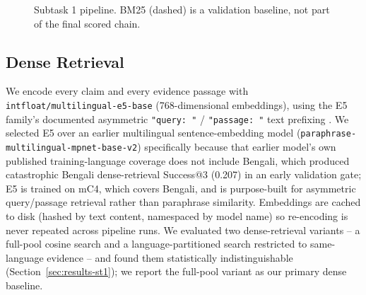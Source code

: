 \documentclass[
]{ceurart}
\begin{document}
\begin{figure}[h]
  \centering
  \caption{Subtask 1 pipeline. BM25 (dashed) is a validation baseline,
    not part of the final scored chain.}
  \label{fig:st1-pipeline}
\end{figure}

\subsection{Dense Retrieval}

We encode every claim and every evidence passage with
\texttt{intfloat/multilingual-e5-base} (768-dimensional embeddings),
using the E5 family's documented asymmetric \texttt{"query: "} /
\texttt{"passage: "} text prefixing \cite{wang2024multilingual}. We
selected E5 over an earlier multilingual sentence-embedding model
(\texttt{paraphrase-multilingual-mpnet-base-v2}) specifically because
that earlier model's own published training-language coverage does not
include Bengali, which produced catastrophic Bengali dense-retrieval
Success@3 (0.207) in an early validation gate; E5 is trained on mC4,
which covers Bengali, and is purpose-built for asymmetric query/passage
retrieval rather than paraphrase similarity. Embeddings are cached to
disk (hashed by text content, namespaced by model name) so re-encoding
is never repeated across pipeline runs. We evaluated two
dense-retrieval variants -- a full-pool cosine search and a
language-partitioned search restricted to same-language evidence -- and
found them statistically indistinguishable
(Section~\ref{sec:results-st1}); we report the full-pool variant as our
primary dense baseline.
\end{document}
